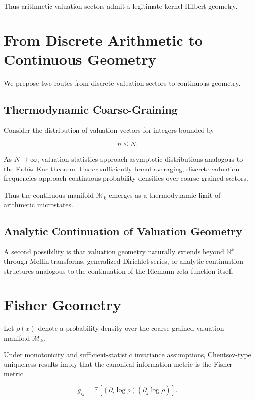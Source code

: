 \documentclass[11pt]{article}
\begin{document}
Thus arithmetic valuation sectors admit a legitimate kernel Hilbert geometry.

\section{From Discrete Arithmetic to Continuous Geometry}

We propose two routes from discrete valuation sectors to continuous geometry.

\subsection{Thermodynamic Coarse-Graining}

Consider the distribution of valuation vectors for integers bounded by

\begin{equation}
n \le N.
\end{equation}

As $N \to \infty$, valuation statistics approach asymptotic distributions analogous to the Erd\H{o}s--Kac theorem. Under sufficiently broad averaging, discrete valuation frequencies approach continuous probability densities over coarse-grained sectors.

Thus the continuous manifold $\mathcal{M}_k$ emerges as a thermodynamic limit of arithmetic microstates.

\subsection{Analytic Continuation of Valuation Geometry}

A second possibility is that valuation geometry naturally extends beyond $\mathbb{N}^k$ through Mellin transforms, generalized Dirichlet series, or analytic continuation structures analogous to the continuation of the Riemann zeta function itself.

\section{Fisher Geometry}

Let $\rho(x)$ denote a probability density over the coarse-grained valuation manifold $\mathcal{M}_k$.

Under monotonicity and sufficient-statistic invariance assumptions, Chentsov-type uniqueness results imply that the canonical information metric is the Fisher metric

\begin{equation}
g_{ij}
=
\mathbb{E}\left[
(\partial_i \log \rho)
(\partial_j \log \rho)
\right].
\end{equation}
\end{document}
